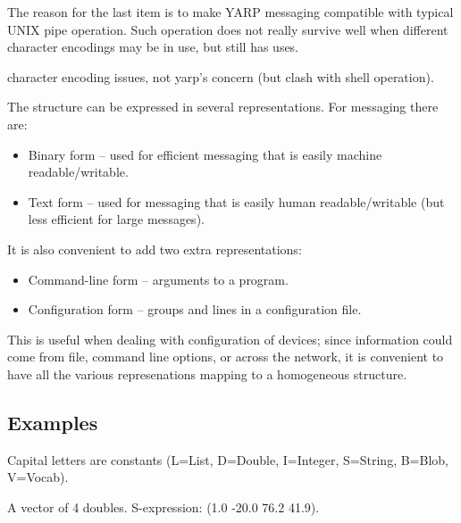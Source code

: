 The reason for the last item is to make YARP messaging compatible
with typical UNIX pipe operation.  Such operation does not 
really survive well when different character encodings may be
in use, but still has uses.



character encoding issues, not yarp's concern (but clash with shell 
operation).


The structure
can be expressed in several representations.  For messaging there are:

\begin{itemize}

\item Binary form -- used for efficient messaging that is
easily machine readable/writable.

\item Text form -- used for messaging that is easily human
readable/writable (but less efficient for large messages).

\end{itemize}

It is also convenient to add two extra representations:

\begin{itemize}

\item Command-line form -- arguments to a program.

\item Configuration form -- groups and lines in a configuration file.

\end{itemize}

This is useful when dealing with configuration of devices; since
information could come from file, command line options, or across the
network, it is convenient to have all the various represenations
mapping to a homogeneous structure.



\subsection{Examples}

Capital letters are constants
(L=List, D=Double, I=Integer, S=String, B=Blob, V=Vocab).



A vector of 4 doubles.  S-expression: (1.0 -20.0 76.2 41.9).

\newcommand{\mm}{p{0.25cm}}
\newcommand{\m}{p{1cm}}
\newcommand{\md}{p{2cm}}

